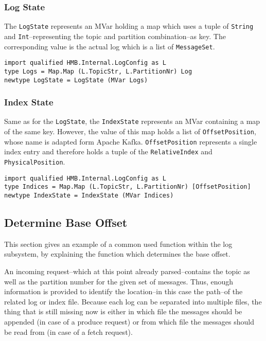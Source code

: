 \newpage
\subsubsection{Log State}

The \lstinline{LogState} represents an MVar holding a map which uses a tuple of
\lstinline{String} and \lstinline{Int}--representing the topic and partition
 combination--as key. The corresponding value is the actual log which is a list
of \lstinline{MessageSet}.

\begin{lstlisting}[caption={Definition of the log state (MVar)}]
import qualified HMB.Internal.LogConfig as L
type Logs = Map.Map (L.TopicStr, L.PartitionNr) Log
newtype LogState = LogState (MVar Logs)
\end{lstlisting}

\subsubsection{Index State}

Same as for the \lstinline{LogState}, the \lstinline{IndexState} represents an
MVar containing a map of the same key. However, the value of this map holds a
list of \lstinline{OffsetPosition}, whose name is adapted form Apache Kafka.
\lstinline{OffsetPosition} represents a single index entry and therefore holds a
tuple of the \lstinline{RelativeIndex} and \lstinline{PhysicalPosition}. 

\begin{lstlisting}[caption={Definition of the index state (MVar)}]
import qualified HMB.Internal.LogConfig as L
type Indices = Map.Map (L.TopicStr, L.PartitionNr) [OffsetPosition]
newtype IndexState = IndexState (MVar Indices)
\end{lstlisting}


\subsection{Determine Base Offset}
\label{subsubsec:broker-log-general-baseoffset}
This section gives an example of a common used function within the log
subsystem, by explaining the function which determines the base offset.

An incoming request--which at this point already parsed--contains the topic as
well as the partition number for the given set of messages. Thus, enough
information is provided to identify the location--in this case the path--of the
related log or index file. Because each log can be separated into multiple files,
the thing that is still missing now is either in which file the messages should
be appended (in case of a produce request) or from which file the messages
should be read from (in case of a fetch request).

